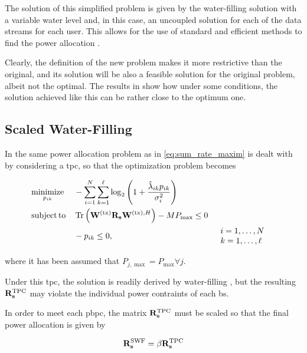 The solution of this simplified problem is given by the water-filling solution
with a variable water level and, in this case, an uncoupled solution for each of
the data streams for each user. This allows for the use of standard and
efficient methods to find the power allocation \cite{cioffi_notes}.

Clearly, the definition of the new problem makes it more restrictive than the
original, and its solution will be also a feasible solution for the original
problem, albeit not the optimal. The results in \cite{armada11b} show how under
some conditions, the solution achieved like this can be rather close to the
optimum one.

\subsection{Scaled Water-Filling}\label{ssec:scaled_wf}

In \cite{zhang09} the same power allocation problem as in
\eqref{eq:sum_rate_maxim} is dealt with by considering a \gls{tpc}, so that the
optimization problem becomes

\begin{equation} \label{eq:optim_scaled_wf}
\begin{aligned}
	&\operatorname*{minimize}\limits_{p_{ik}} &&-\sum\limits_{i = 1}^N
	\sum\limits_{k = 1}^\ell \log_2\left( 1 +
	\frac{\hat{\lambda}_{ik} p_{ik}}{\sigma_i^2} \right)\\
    &\operatorname*{subject\,to} && \operatorname*{Tr}\left( \mathbf{W}^{(\text{tx})} \mathbf{R}_{\mathbf{s}} \mathbf{W}^{(\text{tx}),H} \right) - M P_{\max} \leq 0\\
    & &&-p_{ik} \leq 0, &&
	\begin{array}{l}
	i = 1, \ldots, N\\
	k = 1, \ldots, \ell
	\end{array}
\end{aligned}
\end{equation}

\noindent
where it has been assumed that $P_{j,\max} = P_{\max} \forall j$.

Under this \gls{tpc}, the solution is readily derived by water-filling
\cite{cioffi_notes}, but the resulting $\mathbf{R}_{\mathbf{s}}^{\text{TPC}}$ may violate
the individual power contraints of each \gls{bs}.

In order to meet each \gls{pbpc}, the matrix $\mathbf{R}_{\mathbf{s}}^{\text{TPC}}$ must be
scaled so that the final power allocation is given by

\begin{equation} \label{eq:power_allocation_scaled}
    \mathbf{R}_{\mathbf{s}}^{\text{SWF}} = \beta \mathbf{R}_{\mathbf{s}}^{\text{TPC}}
\end{equation}

